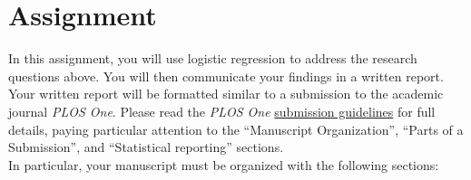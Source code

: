 \documentclass[11pt]{article}
\begin{document}
\section*{Assignment}

In this assignment, you will use logistic regression to address the research questions above. You will then communicate your findings in a written report. Your written report will be formatted similar to a submission to the academic journal \textit{PLOS One}. Please read the \textit{PLOS One} \href{https://journals.plos.org/plosone/s/submission-guidelines}{submission guidelines} for full details, paying particular attention to the ``Manuscript Organization'', ``Parts of a Submission'', and ``Statistical reporting'' sections.\\

\noindent In particular, your manuscript must be organized with the following sections:
\end{document}
